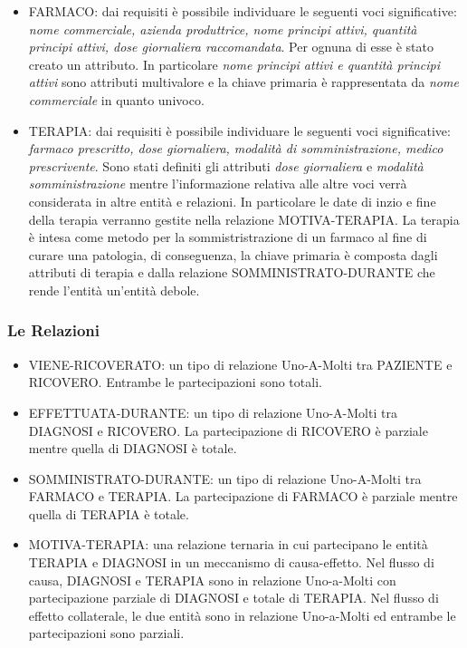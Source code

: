 \documentclass{article}
\begin{document}
\begin{itemize}
        \item FARMACO: dai requisiti è possibile individuare le seguenti voci
              significative: \textit{nome commerciale, azienda produttrice, 
              nome principi attivi, quantità principi attivi, dose giornaliera
              raccomandata}. Per ognuna di esse è stato creato un attributo. In
              particolare \textit{nome principi attivi e quantità principi 
              attivi} sono attributi multivalore e la chiave primaria è 
              rappresentata da \textit{nome commerciale} in quanto univoco.

        \item TERAPIA: dai requisiti è possibile individuare le seguenti voci
              significative: \textit{farmaco prescritto, dose giornaliera, 
              modalità di somministrazione, medico prescrivente}. Sono stati
              definiti gli attributi \textit{dose giornaliera} e 
              \textit{modalità somministrazione} mentre l'informazione relativa
              alle altre voci verrà considerata in altre entità e relazioni.
              In particolare le date di inzio e fine della terapia verranno
              gestite nella relazione MOTIVA-TERAPIA.
              La terapia è intesa come metodo per la sommistristrazione di un
              farmaco al fine di curare una patologia, di conseguenza, la 
              chiave primaria è composta dagli attributi di terapia e dalla
              relazione SOMMINISTRATO-DURANTE che rende l'entità un'entità
              debole.
    \end{itemize}

\subsubsection{Le Relazioni}
    \begin{itemize}
        \item VIENE-RICOVERATO: un tipo di relazione Uno-A-Molti tra PAZIENTE e
              RICOVERO. Entrambe le partecipazioni sono totali.
        
        \item EFFETTUATA-DURANTE: un tipo di relazione Uno-A-Molti tra DIAGNOSI 
              e RICOVERO. La partecipazione di RICOVERO è parziale mentre quella
              di DIAGNOSI è totale.

        \item SOMMINISTRATO-DURANTE: un tipo di relazione Uno-A-Molti tra FARMACO
              e TERAPIA. La partecipazione di FARMACO è parziale mentre quella di
              TERAPIA è totale.
        
        \item MOTIVA-TERAPIA: una relazione ternaria in cui partecipano le entità
              TERAPIA e DIAGNOSI in un meccanismo di causa-effetto. Nel flusso di
              causa, DIAGNOSI e TERAPIA sono in relazione Uno-a-Molti con 
              partecipazione parziale di DIAGNOSI e totale di TERAPIA. Nel flusso
              di effetto collaterale, le due entità sono in relazione Uno-a-Molti
              ed entrambe le partecipazioni sono parziali.
      \end{itemize}                  
                 
\end{document}
